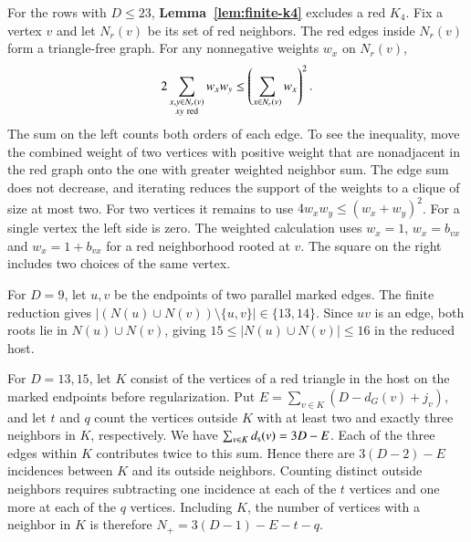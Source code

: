 For the rows with $D\leq23$, \textbf{Lemma~\ref{lem:finite-k4}}
excludes a red $K_4$. Fix a vertex $v$ and let $N_r(v)$ be its set of red
neighbors. The red edges inside $N_r(v)$ form a triangle-free
graph. For any nonnegative weights $w_x$ on $N_r(v)$,
\[
 2\sum_{\substack{x,y\in N_r(v)\\xy\ {\rm red}}}w_xw_y
 \le \left(\sum_{x\in N_r(v)} w_x\right)^2.
\]
The sum on the left counts both orders of each edge. To see the
inequality, move the combined weight of two vertices with positive
weight that are nonadjacent in the red graph
onto the one with greater weighted neighbor sum. The edge sum does
not decrease, and iterating reduces the support of the weights to
a clique of size at most two. For two vertices it remains to use
$4w_xw_y\le(w_x+w_y)^2$. For a single vertex the left side is zero.
The weighted calculation uses
$w_x=1$, $w_x=b_{vx}$ and $w_x=1+b_{vx}$ for a red neighborhood rooted at $v$.
The square on the right includes two choices of the same vertex.


For $D=9$, let $u,v$ be the endpoints of two parallel marked
edges. The finite reduction gives
$|(N(u)\cup N(v))\setminus\{u,v\}|\in\{13,14\}$.
Since $uv$ is an edge, both roots lie in $N(u)\cup N(v)$, giving
$15\leq|N(u)\cup N(v)|\leq16$ in the reduced host.

For $D=13,15$, let $K$ consist of the vertices of a red triangle in
the host on the marked endpoints before regularization. Put
$E=\sum_{v\in K}(D-d_G(v)+j_v)$, and let $t$ and $q$ count the
vertices outside $K$ with at least two and exactly three neighbors
in $K$, respectively. We have $\sum_{v\in K}d_{\rm s}(v)=3D-E$.
Each of the three edges within $K$ contributes twice to this sum.
Hence there are $3(D-2)-E$ incidences between $K$ and its outside
neighbors. Counting distinct outside neighbors requires subtracting
one incidence at each of the $t$ vertices and one more at each of
the $q$ vertices. Including $K$, the number of vertices with a
neighbor in $K$ is therefore $N_+=3(D-1)-E-t-q$.

